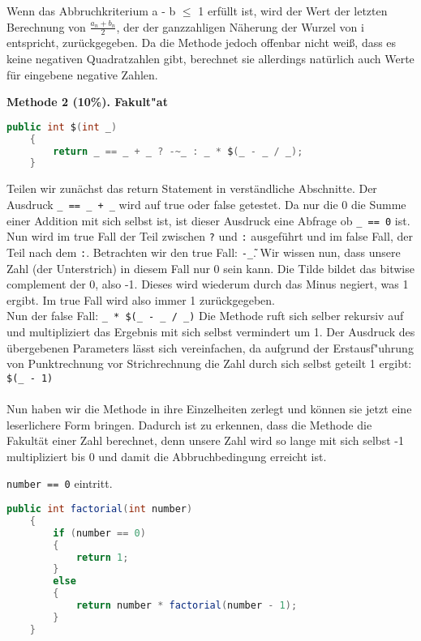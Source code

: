 \documentclass{pi1}
\begin{document}
Wenn das Abbruchkriterium a - b $\leq$ 1 erfüllt ist, wird der Wert der letzten Berechnung von $\frac{a_n + b_n}{2}$, der der ganzzahligen Näherung der Wurzel von i entspricht, zurückgegeben.
Da die Methode jedoch offenbar nicht weiß, dass es keine negativen Quadratzahlen gibt, berechnet sie allerdings natürlich auch Werte für eingebene negative Zahlen.


\textbf{Methode 2 (10\%). Fakult"at } 

\begin{lstlisting}[firstnumber=14, language=Java]
public int $(int _)
    {
        return _ == _ + _ ? -~_ : _ * $(_ - _ / _);
    }
\end{lstlisting}
Teilen wir zunächst das return Statement in verständliche Abschnitte. Der Ausdruck \texttt{\_ == \_ + \_} wird auf true oder false getestet. Da nur die 0 die Summe einer Addition mit sich selbst ist, ist dieser Ausdruck eine Abfrage ob \texttt{\_ == 0} ist.\\
Nun wird im true Fall der Teil zwischen \texttt{?} und \texttt{:} ausgeführt und im false Fall, der Teil nach dem  \texttt{:}. Betrachten wir den true Fall: \texttt{-\~\_}. Wir wissen nun, dass unsere Zahl (der Unterstrich) in diesem Fall nur 0 sein kann. Die Tilde bildet das bitwise complement der 0, also -1. Dieses wird wiederum durch das Minus negiert, was 1 ergibt. Im true Fall wird also immer 1 zurückgegeben.\\
Nun der false Fall: \texttt{\_ * \$(\_ - \_ / \_)} Die Methode ruft sich selber rekursiv auf und multipliziert das Ergebnis mit sich selbst vermindert um 1. Der Ausdruck des übergebenen Parameters lässt sich vereinfachen, da aufgrund der Erstausf"uhrung von Punktrechnung vor Strichrechnung die Zahl durch sich selbst geteilt 1 ergibt: \texttt{\$(\_ - 1)}\\
\\ Nun haben wir die Methode in ihre Einzelheiten zerlegt und können sie jetzt eine leserlichere Form bringen. Dadurch ist zu erkennen, dass die Methode die Fakultät einer Zahl berechnet, denn unsere Zahl wird so lange mit sich selbst -1 multipliziert bis 0 und damit die Abbruchbedingung erreicht ist.

\texttt{number == 0} eintritt.

\begin{lstlisting}[caption={Methode factorial()}, firstnumber=65, language=Java]
public int factorial(int number)
    {
        if (number == 0)
        {
            return 1;
        }
        else
        {
            return number * factorial(number - 1);
        }
    }
\end{lstlisting}
\end{document}
